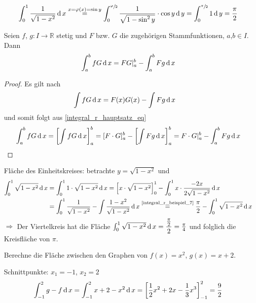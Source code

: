 \begin{example}
	\zeroAmsmathAlignVSpaces*
	\begin{align*}
		\int_0^1 \frac{1}{\sqrt{1 - x^2}} \operatorname{d} x \overset{x = \varphi(x) = \sin y}{=} \int_0^{\sfrac{\varphi}{2}} \frac{1}{\sqrt{1 - \sin^2 y}} \cdot \cos y \operatorname{d} y = \int_0^{\sfrac{\pi}{2}} 1 \operatorname{d} y = \frac{\pi}{2}
	\end{align*}
\end{example}

\begin{proposition}
	Seien $f$, $g:I\to\mathbb{R}$ stetig und $F$ bzw. $G$ die zugehörigen Stammfunktionen, $a$,$b\in I$. Dann \begin{align*}
		\int_a^b f G \operatorname{d} x = FG|^b_a - \int_a^b F g \operatorname{d} x
	\end{align*}
\end{proposition}

 \begin{proof}
 	Es gilt nach 
 	\begin{align*}
	 	\int f G\operatorname{d} x &= F(x) G(x) - \int F g \operatorname{d} x
 	\end{align*}
 	und somit folgt aus \eqref{integral_r_hauptsatz_eq} \begin{align*}
	 	\int_a^b f G \operatorname{d} x = \left[ \int f G \operatorname{d} x \right]_a^b = [F \cdot G]_a^b - \left[ \int F g \operatorname{d} x \right] _a^b = F \cdot G |_a^b - \int_a^b F g \operatorname{d} x
 	\end{align*}
 \end{proof}

\begin{example}
	Fläche des Einheitskreises: betrachte $y = \sqrt{1 - x^2}$ und \begin{align*}
		\int_0^1 \sqrt{1-x^2}\D x &= \int_0^1 1 \cdot\sqrt{1 - x^2} \D x = \left[ x \cdot \sqrt{1 - x^2} \right]_0^1 - \int_0^1 x \cdot \frac{-2x}{2 \sqrt{1 - x^2}} \D x\\
		&= \int_0^1 \frac{1}{\sqrt{1 - x^2}} - \int \frac{1-x^2}{\sqrt{1-x^2}} \D x \overset{\text{\cref{integral_r_beispiel_7}}}{=} \frac{\pi}{2} - \int_0^1 \sqrt{1 - x^2} \D x
	\end{align*}
	$\Rightarrow$ Der Viertelkreis hat die Fläche $\int_0^1 \sqrt{1-x^2}\operatorname{d} x = \dfrac{\frac{\pi}{2}}{2} = \frac{\pi}{4}$ und folglich die Kreisfläche von $\pi$.
\end{example}

\begin{example}
	Berechne die Fläche zwischen den Graphen von $f(x) = x^2$, $g(x) = x+2$.
	
	Schnittpunkte: $x_1 = -1$, $x_2 = 2$
	\begin{align*}
		\int_{-1}^2 g - f \operatorname{d} x = \int_{-1}^2 x + 2 - x^2 \operatorname{d} x = \left[ \frac{1}{2}x^2 + 2x - \frac{1}{3} x^3 \right]_{-1}^2 = \frac{9}{2}
	\end{align*}
\end{example}

